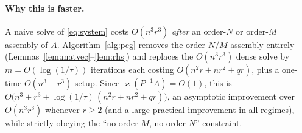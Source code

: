 \documentclass[12pt]{article}
\theoremstyle{remark}
\begin{document}
\paragraph{Why this is faster.} A naive solve of \eqref{eq:system} costs $O(n^3r^3)$ \emph{after} an order-$N$ or order-$M$ assembly of $A$. Algorithm~\ref{alg:pcg} removes the order-$N/M$ assembly entirely (Lemmas~\ref{lem:matvec}--\ref{lem:rhs}) and replaces the $O(n^3r^3)$ dense solve by $m=O(\log(1/\tau))$ iterations each costing $O(n^2r+nr^2+qr)$, plus a one-time $O(n^3+r^3)$ setup. Since $\varkappa(P^{-1}A)=O(1)$, this is $O\!\big(n^3+r^3+\log(1/\tau)\,(n^2r+nr^2+qr)\big)$, an asymptotic improvement over $O(n^3r^3)$ whenever $r\ge2$ (and a large practical improvement in all regimes), while strictly obeying the ``no order-$M$, no order-$N$'' constraint.
\end{document}
